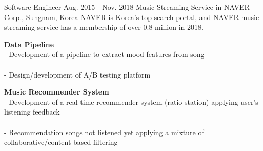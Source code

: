 \begin{cventries}
    \cventry
        {Software Engineer} %
        {Aug. 2015 - Nov. 2018} %
        {Music Streaming Service in NAVER Corp., } %
        {Sungnam, Korea}%
        { %
            NAVER is Korea's top search portal, and NAVER music streaming service has a membership of over 0.8 million in 2018.
        }
        { %
            \begin{cvitems}
                \item {
                    {\bf Data Pipeline} \\
                    - Development of a pipeline to extract mood features from song \\
                         \\
                    - Design/development of A/B testing platform 
                         \nn
                }
                \item {
                    {\bf Music Recommender System} \\
                    - Development of a real-time recommender system (ratio station) applying user's listening feedback \\
                         \\
                    - Recommendation songs not listened yet applying a mixture of collaborative/content-based filtering \\
                         \nn
                }
            \end{cvitems}
        }
\end{cventries}
